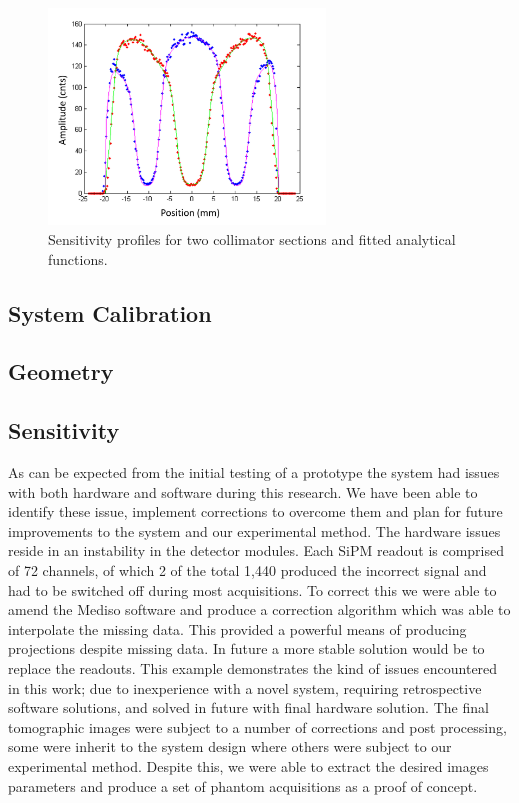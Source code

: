 \begin{figure}[!t]
\centering
\includegraphics[width=2.9in]{figures/sns_prof.png}

\caption{Sensitivity profiles for two collimator sections and fitted analytical functions.}
\label{fig_sensprof}
\end{figure}

\subsection{System Calibration}
\subsection{Geometry}
\subsection{Sensitivity}

As can be expected from the initial testing of a prototype
the system had issues with both hardware and software during
this research. We have been able to identify these issue,
implement corrections to overcome them and plan for future
improvements to the system and our experimental method. The
hardware issues reside in an instability in the detector modules.
Each SiPM readout is comprised of 72 channels, of which 2
of the total 1,440 produced the incorrect signal and had to be
switched off during most acquisitions. To correct this we were
able to amend the Mediso software and produce a correction
algorithm which was able to interpolate the missing data. This
provided a powerful means of producing projections despite
missing data. In future a more stable solution would be to
replace the readouts. This example demonstrates the kind of
issues encountered in this work; due to inexperience with a
novel system, requiring retrospective software solutions, and
solved in future with final hardware solution.
The final tomographic images were subject to a number
of corrections and post processing, some were inherit to the
system design where others were subject to our experimental
method. Despite this, we were able to extract the desired
images parameters and produce a set of phantom acquisitions
as a proof of concept.

